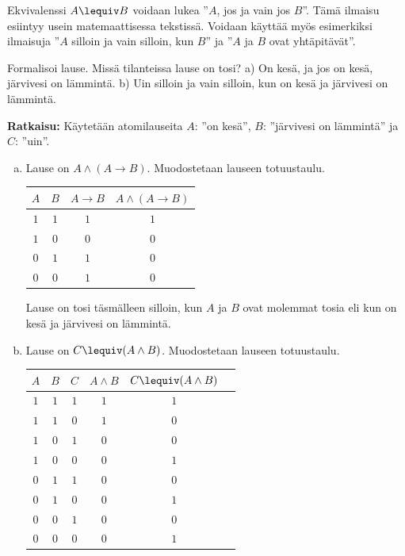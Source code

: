 \bigskip

Ekvivalenssi $A\lequiv B$ voidaan lukea ''$A$, jos ja vain jos $B$''. Tämä ilmaisu esiintyy usein matemaattisessa tekstissä. Voidaan käyttää myös esimerkiksi ilmaisuja ''$A$ silloin ja vain silloin, kun $B$'' ja ''$A$ ja $B$ ovat yhtäpitävät''.


\begin{esimerkki}
Formalisoi lause. Missä tilanteissa lause on tosi? a) On kesä, ja jos on kesä, järvivesi on lämmintä. b) Uin silloin ja vain silloin, kun on kesä ja järvivesi on lämmintä. 

{\bf Ratkaisu:}
Käytetään atomilauseita $A$: ''on kesä'',
$B$: ''järvivesi on lämmintä'' ja $C$: ''uin''.
\begin{enumerate}[a)]
\item Lause on $A \land (A \to B)$. Muodostetaan
lauseen totuustaulu.

\bigskip

\begin{center}
\begin{tabular}{|c|c|c|c|}\hline
$A$ & $B$ & $A \to B$ & $A \land (A \to B)$\\ \hline
$1$ & $1$ & $1$ & $1$\\ %
$1$ & $0$ & $0$ & $0$\\
$0$ & $1$ & $1$ & $0$\\
$0$ & $0$ & $1$ & $0$\\ \hline
\end{tabular}
\end{center}

\bigskip

Lause on tosi täsmälleen silloin, kun $A$ ja $B$ ovat
molemmat tosia eli kun on kesä ja järvivesi on lämmintä.
\item Lause on $C \lequiv (A \land B)$. Muodostetaan
lauseen totuustaulu.

\bigskip

\begin{center}
\begin{tabular}{|c|c|c|c|c|c|}\hline
$A$ & $B$ & $C$ & $A \land B$ & $C \lequiv (A \land B)$\\
\hline
$1$ & $1$ & $1$ & $1$ & $1$\\ %
$1$ & $1$ & $0$ & $1$ & $0$\\
$1$ & $0$ & $1$ & $0$ & $0$\\ %
$1$ & $0$ & $0$ & $0$ & $1$\\
$0$ & $1$ & $1$ & $0$ & $0$\\
$0$ & $1$ & $0$ & $0$ & $1$\\ %
$0$ & $0$ & $1$ & $0$ & $0$\\
$0$ & $0$ & $0$ & $0$ & $1$\\ \hline
\end{tabular}
\end{center}


\end{enumerate}
\end{esimerkki}
